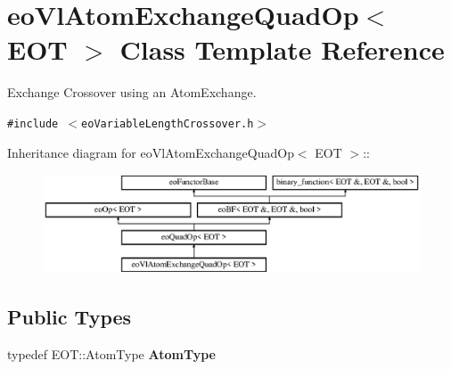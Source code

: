 \section{eo\-Vl\-Atom\-Exchange\-Quad\-Op$<$ EOT $>$ Class Template Reference}
\label{classeo_vl_atom_exchange_quad_op}
Exchange Crossover using an Atom\-Exchange.  


{\tt \#include $<$eo\-Variable\-Length\-Crossover.h$>$}

Inheritance diagram for eo\-Vl\-Atom\-Exchange\-Quad\-Op$<$ EOT $>$::\begin{figure}[H]
\begin{center}
\leavevmode
\includegraphics[height=2.96296cm]{classeo_vl_atom_exchange_quad_op}
\end{center}
\end{figure}
\subsection*{Public Types}
\begin{CompactItemize}
\item 
typedef EOT::Atom\-Type {\bf Atom\-Type}\label{classeo_vl_atom_exchange_quad_op_w0}

\end{CompactItemize}
